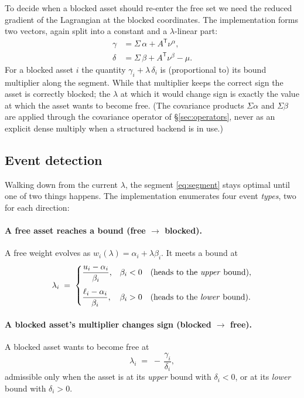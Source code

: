 \documentclass[11pt]{article}
\newcommand{\Sig}{\Sigma}
\newcommand{\lb}{\ell}              %
\newcommand{\ub}{u}                 %
\newcommand{\trans}{^{\mathsf{T}}}
\begin{document}
To decide when a blocked asset should re-enter the free set we need the reduced
gradient of the Lagrangian at the blocked coordinates. The implementation forms two
vectors, again split into a constant and a $\lambda$-linear part:
\begin{align}
\gamma &= \Sig\,\alpha + A\trans \nu^{\alpha}, \label{eq:gamma}\\
\delta &= \Sig\,\beta + A\trans \nu^{\beta} - \mu. \label{eq:delta}
\end{align}
For a blocked asset $i$ the quantity $\gamma_i + \lambda\,\delta_i$ is (proportional to)
its bound multiplier along the segment. While that multiplier keeps the correct sign
the asset is correctly blocked; the $\lambda$ at which it would change sign is exactly
the value at which the asset wants to become free. (The covariance products
$\Sig\alpha$ and $\Sig\beta$ are applied through the covariance operator of
\S\ref{sec:operators}, never as an explicit dense multiply when a structured backend is
in use.)

\subsection{Event detection}
\label{sec:events}

Walking down from the current $\lambda$, the segment \eqref{eq:segment} stays optimal
until one of two things happens. The implementation enumerates four event \emph{types},
two for each direction:

\paragraph{A free asset reaches a bound (free $\to$ blocked).}
A free weight evolves as $w_i(\lambda) = \alpha_i + \lambda\beta_i$. It meets a bound at
\begin{equation}
\label{eq:freeevents}
\lambda_i \;=\;
\begin{cases}
\dfrac{\ub_i - \alpha_i}{\beta_i}, & \beta_i < 0 \quad\text{(heads to the \emph{upper} bound)},\\[1.2em]
\dfrac{\lb_i - \alpha_i}{\beta_i}, & \beta_i > 0 \quad\text{(heads to the \emph{lower} bound)}.
\end{cases}
\end{equation}

\paragraph{A blocked asset's multiplier changes sign (blocked $\to$ free).}
A blocked asset wants to become free at
\begin{equation}
\label{eq:blockedevents}
\lambda_i \;=\; -\,\frac{\gamma_i}{\delta_i},
\end{equation}
admissible only when the asset is at its \emph{upper} bound with $\delta_i < 0$, or at
its \emph{lower} bound with $\delta_i > 0$.
\end{document}
